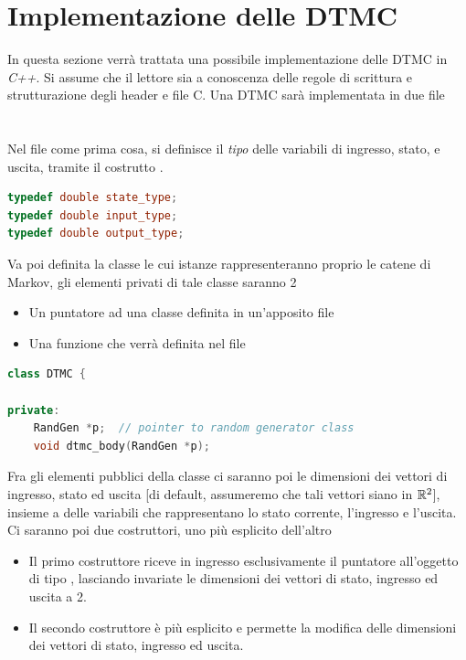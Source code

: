 \documentclass[10pt, letterpaper]{report}
\begin{document}
\section{Implementazione delle DTMC}
In questa sezione verrà trattata una possibile implementazione delle DTMC in \textit{C++}. Si assume che il lettore sia a conoscenza delle regole di scrittura e strutturazione degli header e file C. \acc 
Una DTMC sarà implementata in due file \\
\\ 
\\
Nel file  come prima cosa, si definisce il \textit{tipo} delle variabili di ingresso, stato, e 
uscita, tramite il costrutto .\begin{lstlisting}[style=CppStyle,language=C++]
typedef double state_type;
typedef double input_type;
typedef double output_type;
\end{lstlisting}
Va poi definita la classe  le cui istanze rappresenteranno proprio le catene di Markov, gli elementi privati di tale classe saranno 2\begin{itemize} 
    \item Un puntatore ad una classe  definita in un'apposito file 
    \item Una funzione  che verrà definita nel file 
\end{itemize}
\begin{lstlisting}[style=CppStyle,language=C++]
class DTMC {

private:
    RandGen *p;  // pointer to random generator class 
    void dtmc_body(RandGen *p);
\end{lstlisting}
Fra gli elementi pubblici della classe ci saranno poi le dimensioni dei vettori di ingresso, stato ed uscita [di default, assumeremo che tali vettori siano in ${\mathbb R}^2$], insieme a delle variabili che rappresentano lo stato corrente, l'ingresso e l'uscita. Ci saranno poi due costruttori, uno più esplicito dell'altro\begin{itemize}
    \item Il primo costruttore riceve in ingresso esclusivamente il puntatore all'oggetto di tipo 
    , lasciando invariate le dimensioni dei vettori di stato, ingresso ed uscita a 2. 
    \item Il secondo costruttore è più esplicito e permette la modifica delle dimensioni dei vettori di stato, ingresso ed uscita.
\end{itemize}
\end{document}
